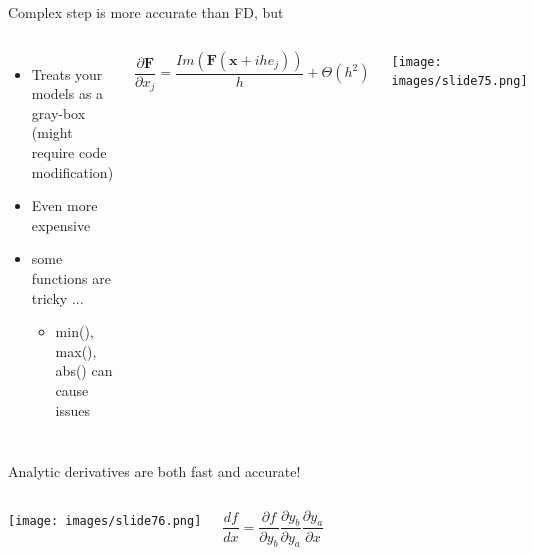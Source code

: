 \documentclass[aspectratio=169, usenames, dvipsnames, 14pt]{beamer}
\begin{document}
 \begin{frame}{Complex step is more accurate than FD, but}
     \begin{columns}
             \begin{itemize}
                 \item Treats your models as a gray-box (might require code modification)
                 \item Even more expensive
                 \item some functions are tricky ...
                     \begin{itemize}
                         \item min(), max(), abs() can cause issues
                     \end{itemize}
             \end{itemize}
 
             \vspace{-0.5cm}
 
             \begin{equation*}
                 \frac{\partial \textbf{F}}{\partial x_{j}} =\frac{Im(\textbf{F}(\textbf{x}+ihe_{j}))}{h} +\Theta (h^{2})
             \end{equation*}
 
             \texttt{[image: images/slide75.png]}
     \end{columns}
 
 \end{frame}    



 \begin{frame}{Analytic derivatives are both fast and accurate!}
 \begin{columns}
         \texttt{[image: images/slide76.png]}
 
         \vspace{2cm}
         \begin{equation*}
             \frac{df}{dx} = \frac{\partial f}{\partial y_{b}} \frac{\partial y_{b}}{\partial y_{a}} \frac{\partial y_{a}}{\partial x}
         \end{equation*}
 \end{columns}
 
 \end{frame}
\end{document}
